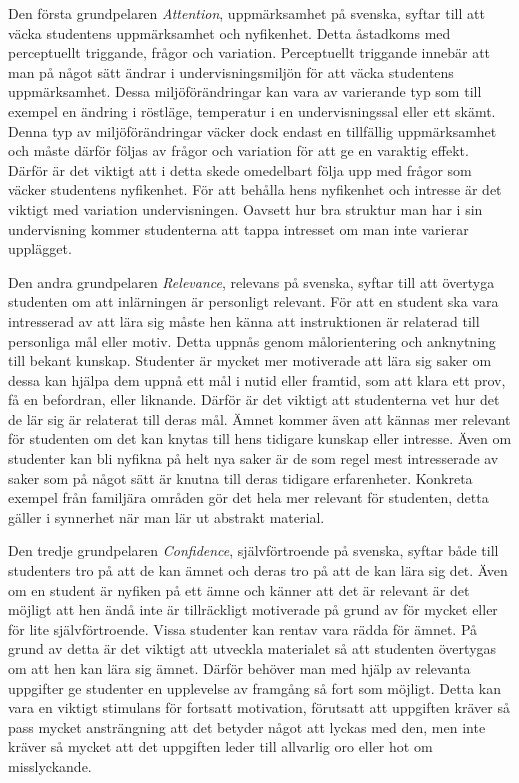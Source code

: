 \documentclass[12pt,a4paper,twoside,openright]{article}
\begin{document}
Den första grundpelaren \textit{Attention}, uppmärksamhet på svenska,
syftar till att väcka studentens uppmärksamhet och nyfikenhet.
Detta åstadkoms med perceptuellt triggande, frågor och variation.
Perceptuellt triggande innebär att man på något sätt ändrar i
undervisningsmiljön för att väcka studentens uppmärksamhet. Dessa
miljöförändringar kan vara av varierande typ som till exempel en
ändring i röstläge, temperatur i en undervisningssal eller ett skämt.
Denna typ av miljöförändringar väcker dock endast en tillfällig
uppmärksamhet och måste därför följas av frågor och variation för att
ge en varaktig effekt. Därför är det viktigt att i detta skede
omedelbart följa upp med frågor som väcker studentens nyfikenhet. För
att behålla hens nyfikenhet och intresse är det viktigt med variation
undervisningen. Oavsett hur bra struktur man har i sin undervisning
kommer studenterna att tappa intresset om man inte varierar upplägget.

Den andra grundpelaren \textit{Relevance}, relevans på svenska, syftar
till att övertyga studenten om att inlärningen är personligt relevant.
För att en student ska vara intresserad av att lära sig måste hen
känna att instruktionen är relaterad till personliga mål eller motiv.
Detta uppnås genom målorientering och anknytning till bekant kunskap.
Studenter är mycket mer motiverade att lära sig saker om dessa kan
hjälpa dem uppnå ett mål i nutid eller framtid, som att klara ett
prov, få en befordran, eller liknande. Därför är det viktigt att
studenterna vet hur det de lär sig är relaterat till deras mål. Ämnet
kommer även att kännas mer relevant för studenten om det kan knytas
till hens tidigare kunskap eller intresse. Även om studenter kan bli
nyfikna på helt nya saker är de som regel mest intresserade av saker
som på något sätt är knutna till deras tidigare erfarenheter.
Konkreta exempel från familjära områden gör det hela mer relevant för
studenten, detta gäller i synnerhet när man lär ut abstrakt material.

Den tredje grundpelaren \textit{Confidence}, självförtroende på
svenska, syftar både till studenters tro på att de kan ämnet och deras
tro på att de kan lära sig det. Även om en student är nyfiken på ett
ämne och känner att det är relevant är det möjligt att hen ändå inte
är tillräckligt motiverade på grund av för mycket eller för lite
självförtroende. Vissa studenter kan rentav vara rädda för ämnet. På
grund av detta är det viktigt att utveckla materialet så att studenten
övertygas om att hen kan lära sig ämnet. Därför behöver man med hjälp
av relevanta uppgifter ge studenter en upplevelse av framgång så fort
som möjligt. Detta kan vara en viktigt stimulans för fortsatt
motivation, förutsatt att uppgiften kräver så pass mycket ansträngning
att det betyder något att lyckas med den, men inte kräver så mycket
att det uppgiften leder till allvarlig oro eller hot om misslyckande.
\end{document}
